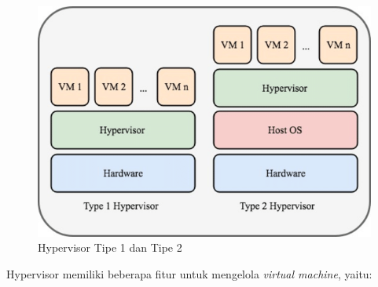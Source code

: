 \begin{figure}[H]
  \centering

  \includegraphics[scale=0.55]{gambar/Type-1-and-type-2-hypervisors.png}

  \caption{Hypervisor Tipe 1 dan Tipe 2 \parencite{nfv}}
  \label{fig:arsitektur-hypervisor-1-2}
\end{figure}

Hypervisor memiliki beberapa fitur untuk mengelola \emph{virtual machine}, yaitu:

